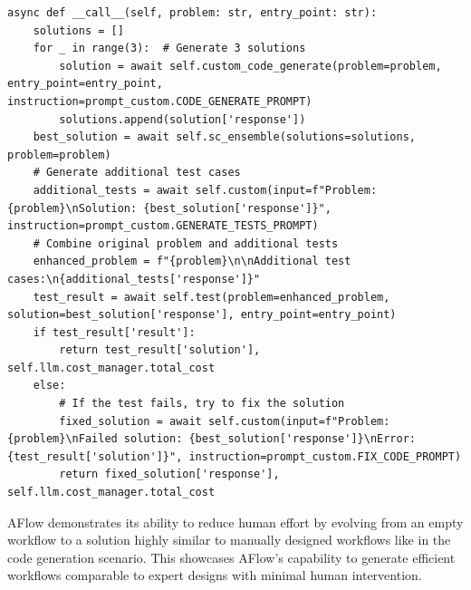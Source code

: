 \documentclass{article} %
\newcommand{\model}{{\sc AFlow}\xspace}
\theoremstyle{plain}
\theoremstyle{definition}
\theoremstyle{remark}
\begin{document}
\begin{tcolorbox}
\begin{verbatim}
async def __call__(self, problem: str, entry_point: str):
    solutions = []
    for _ in range(3):  # Generate 3 solutions
        solution = await self.custom_code_generate(problem=problem, entry_point=entry_point, instruction=prompt_custom.CODE_GENERATE_PROMPT)
        solutions.append(solution['response'])
    best_solution = await self.sc_ensemble(solutions=solutions, problem=problem)
    # Generate additional test cases
    additional_tests = await self.custom(input=f"Problem: {problem}\nSolution: {best_solution['response']}", instruction=prompt_custom.GENERATE_TESTS_PROMPT)
    # Combine original problem and additional tests
    enhanced_problem = f"{problem}\n\nAdditional test cases:\n{additional_tests['response']}"
    test_result = await self.test(problem=enhanced_problem, solution=best_solution['response'], entry_point=entry_point)
    if test_result['result']:
        return test_result['solution'], self.llm.cost_manager.total_cost
    else:
        # If the test fails, try to fix the solution
        fixed_solution = await self.custom(input=f"Problem: {problem}\nFailed solution: {best_solution['response']}\nError: {test_result['solution']}", instruction=prompt_custom.FIX_CODE_PROMPT)
        return fixed_solution['response'], self.llm.cost_manager.total_cost
\end{verbatim}
\end{tcolorbox}
\model demonstrates its ability to reduce human effort by evolving from an empty workflow to a solution highly similar to manually designed workflows like \citet{Tal2024Alpha} in the code generation scenario. This showcases \model's capability to generate efficient workflows comparable to expert designs with minimal human intervention.
\end{document}
